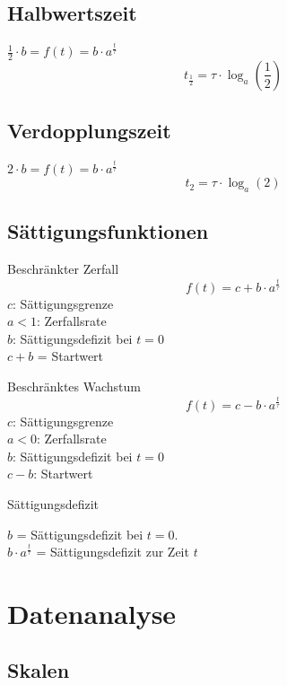 \begin{multicols}{2}
\subsection*{Halbwertszeit}
$\frac12 \cdot{} b = f(t) = b\cdot{}a^{\frac{t}{\tau}}$
$$t_{\frac12} = \tau\cdot{}\log_a\left(\frac12\right)$$

\subsection*{Verdopplungszeit}
$2\cdot{}b = f(t) = b\cdot{}a^{\frac{t}{\tau}}$
$$t_{2} = \tau\cdot{}\log_a(2)$$

\subsection*{Sättigungsfunktionen}
\begin{gesetz*}{Beschränkter Zerfall}{}
$$f(t) = c + b\cdot{}a^\frac{t}\tau$$
$c$: Sättigungsgrenze\\
$a<1$: Zerfallsrate\\
$b$: Sättigungsdefizit bei $t=0$\\
$c+b$ = Startwert 
\end{gesetz*}

\begin{gesetz*}{Beschränktes Wachstum}{}
$$f(t) = c - b\cdot{}a^\frac{t}\tau$$
$c$: Sättigungsgrenze\\
$a<0$: Zerfallsrate\\
$b$: Sättigungsdefizit bei $t=0$\\
$c-b$: Startwert
\end{gesetz*}

\begin{bemerkung*}{Sättigungsdefizit}{}

$b$ = Sättigungsdefizit bei $t=0$.\\
$b\cdot{}a^\frac{t}\tau$ = Sättigungsdefizit zur Zeit $t$
\end{bemerkung*}

\end{multicols}

\hrulefill
\section*{Datenanalyse}

\subsection*{Skalen}
\vspace{5mm}



